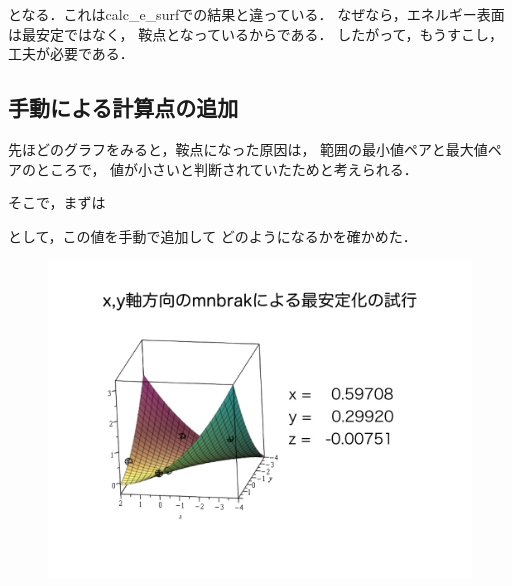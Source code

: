となる．これはcalc\_e\_surfでの結果と違っている．
なぜなら，エネルギー表面は最安定ではなく， 鞍点となっているからである．
したがって，もうすこし，工夫が必要である．

    \subsection{手動による計算点の追加}\label{ux624bux52d5ux306bux3088ux308bux8a08ux7b97ux70b9ux306eux8ffdux52a0}

先ほどのグラフをみると，鞍点になった原因は，
範囲の最小値ペアと最大値ペアのところで，
値が小さいと判断されていたためと考えられる．

そこで，まずは

\begin{Shaded}
\begin{Highlighting}[]
\NormalTok{)}
  \NormalTok{+}\NormalTok{+}\NormalTok{)}
\end{Highlighting}
\end{Shaded}

として，この値を手動で追加して どのようになるかを確かめた．

\begin{figure}[H]
\centering
\begin{center}
\includegraphics[width=150mm]{../.././thesis/thesis.008.jpeg}
\end{center}
\caption{{}}

\label{fig:}
\end{figure}

